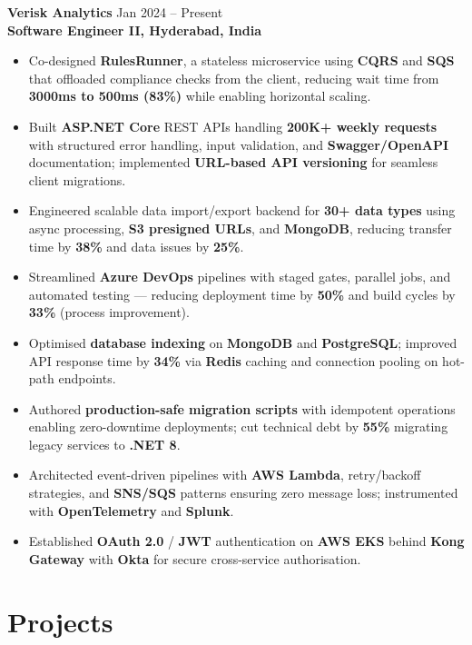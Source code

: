 \documentclass[letterpaper,10pt]{article}
\begin{document}
\textbf{Verisk Analytics} \hfill Jan 2024 -- Present \\
\textbf{Software Engineer II, Hyderabad, India}

\begin{itemize}[leftmargin=*]
    \item Co-designed \textbf{RulesRunner}, a stateless microservice using \textbf{CQRS} and \textbf{SQS} that offloaded compliance checks from the client, reducing wait time from \textbf{3000ms to 500ms (83\%)} while enabling horizontal scaling.
    \item Built \textbf{ASP.NET Core} REST APIs handling \textbf{200K+ weekly requests} with structured error handling, input validation, and \textbf{Swagger/OpenAPI} documentation; implemented \textbf{URL-based API versioning} for seamless client migrations.
    \item Engineered scalable data import/export backend for \textbf{30+ data types} using async processing, \textbf{S3 presigned URLs}, and \textbf{MongoDB}, reducing transfer time by \textbf{38\%} and data issues by \textbf{25\%}.
    \item Streamlined \textbf{Azure DevOps} pipelines with staged gates, parallel jobs, and automated testing --- reducing deployment time by \textbf{50\%} and build cycles by \textbf{33\%} (process improvement).
    \item Optimised \textbf{database indexing} on \textbf{MongoDB} and \textbf{PostgreSQL}; improved API response time by \textbf{34\%} via \textbf{Redis} caching and connection pooling on hot-path endpoints.
    \item Authored \textbf{production-safe migration scripts} with idempotent operations enabling zero-downtime deployments; cut technical debt by \textbf{55\%} migrating legacy services to \textbf{.NET 8}.
    \item Architected event-driven pipelines with \textbf{AWS Lambda}, retry/backoff strategies, and \textbf{SNS/SQS} patterns ensuring zero message loss; instrumented with \textbf{OpenTelemetry} and \textbf{Splunk}.
    \item Established \textbf{OAuth 2.0} / \textbf{JWT} authentication on \textbf{AWS EKS} behind \textbf{Kong Gateway} with \textbf{Okta} for secure cross-service authorisation.
\end{itemize}

\section*{Projects}
\end{document}
